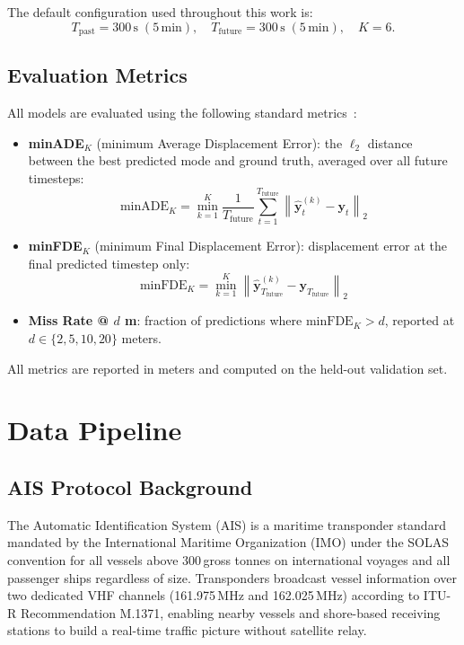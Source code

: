 \documentclass[12pt, a4paper]{article}
\begin{document}
  The default configuration used throughout this work is:
  \[
      T_{\text{past}} = 300\,\text{s}\;(5\,\text{min}),
      \quad T_{\text{future}} = 300\,\text{s}\;(5\,\text{min}),
      \quad K = 6.
  \]

  \subsection{Evaluation Metrics}
  \label{sec:metrics}

  All models are evaluated using the following standard metrics~\citep{feng2024unitraj}:

  \begin{itemize}
      \item \textbf{minADE$_K$} (minimum Average Displacement Error): the $\ell_2$ distance between the best predicted mode and ground truth, averaged over all future timesteps:
      \[
          \text{minADE}_K = \min_{k=1}^{K} \frac{1}{T_{\text{future}}} \sum_{t=1}^{T_{\text{future}}} \left\| \hat{\mathbf{y}}^{(k)}_t - \mathbf{y}_t \right\|_2
      \]

      \item \textbf{minFDE$_K$} (minimum Final Displacement Error): displacement error at the final predicted timestep only:
      \[
          \text{minFDE}_K = \min_{k=1}^{K} \left\| \hat{\mathbf{y}}^{(k)}_{T_{\text{future}}} - \mathbf{y}_{T_{\text{future}}} \right\|_2
      \]

      \item \textbf{Miss Rate @ $d$ m}: fraction of predictions where $\text{minFDE}_K > d$, reported at $d \in \{2, 5, 10, 20\}$ meters.
  \end{itemize}

  All metrics are reported in meters and computed on the held-out validation set.

  \section{Data Pipeline}
  \label{sec:pipeline}


  \subsection{AIS Protocol Background}
  \label{sec:ais_background}

  The Automatic Identification System (AIS) is a maritime transponder standard mandated by
  the International Maritime Organization (IMO) under the SOLAS convention for all vessels
  above 300\,gross tonnes on international voyages and all passenger ships regardless of size.
  Transponders broadcast vessel information over two dedicated VHF channels (161.975\,MHz and
  162.025\,MHz) according to ITU-R Recommendation M.1371, enabling nearby vessels and
  shore-based receiving stations to build a real-time traffic picture without satellite relay.
\end{document}
